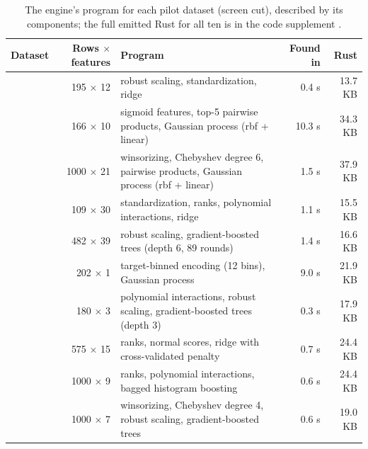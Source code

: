 \begin{table}[t]
\caption{The engine's program for each pilot dataset (screen cut), described by its components;
the full emitted Rust for all ten is in the code supplement \est.}
\label{tab:programs}
\centering\sffamily\footnotesize\lining
\begin{tabularx}{\linewidth}{@{}lrLrr@{}}
\toprule
Dataset & Rows $\times$ features & Program & Found in & Rust \\
\midrule
{} & 195 $\times$ 12 & robust scaling, standardization, ridge & 0.4 s & 13.7 KB \\
 & 166 $\times$ 10 & sigmoid features, top-5 pairwise products, Gaussian process (rbf + linear) & 10.3 s & 34.3 KB \\
 & 1000 $\times$ 21 & winsorizing, Chebyshev degree 6, pairwise products, Gaussian process (rbf + linear) & 1.5 s & 37.9 KB \\
 & 109 $\times$ 30 & standardization, ranks, polynomial interactions, ridge & 1.1 s & 15.5 KB \\
 & 482 $\times$ 39 & robust scaling, gradient-boosted trees (depth 6, 89 rounds) & 1.4 s & 16.6 KB \\
 & 202 $\times$ 1 & target-binned encoding (12 bins), Gaussian process & 9.0 s & 21.9 KB \\
 & 180 $\times$ 3 & polynomial interactions, robust scaling, gradient-boosted trees (depth 3) & 0.3 s & 17.9 KB \\
 & 575 $\times$ 15 & ranks, normal scores, ridge with cross-validated penalty & 0.7 s & 24.4 KB \\
 & 1000 $\times$ 9 & ranks, polynomial interactions, bagged histogram boosting & 0.6 s & 24.4 KB \\
 & 1000 $\times$ 7 & winsorizing, Chebyshev degree 4, robust scaling, gradient-boosted trees & 0.6 s & 19.0 KB \\
\bottomrule
\end{tabularx}
\end{table}

